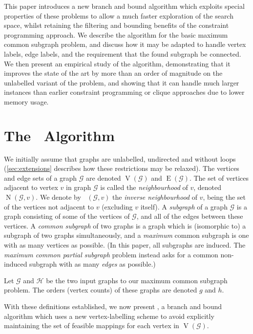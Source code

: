 \documentclass[letterpaper]{article}
\newcommand{\McSplit}{\textproc{McSplit}}
\newcommand{\graphG}{\mathcal{G}}
\newcommand{\graphH}{\mathcal{H}}
\DeclareMathOperator{\V}{V}
\DeclareMathOperator{\E}{E}
\DeclareMathOperator{\N}{N}
\DeclareMathOperator{\invN}{\overline{N}}
\begin{document}
This paper introduces a new branch and bound algorithm which exploits special
properties of these problems to allow a much faster exploration of the search
space, whilst retaining the filtering and bounding benefits of the constraint
programming approach. We describe the algorithm for the basic maximum common
subgraph problem, and discuss how it may be adapted to handle vertex labels,
edge labels, and the requirement that the found subgraph be connected. We then
present an empirical study of the algorithm, demonstrating that it improves the
state of the art by more than an order of magnitude on the unlabelled variant
of the problem, and showing that it can handle much larger instances than
earlier constraint programming or clique approaches due to lower memory usage.

\section{The \McSplit\ Algorithm}

We initially assume that graphs are unlabelled, undirected and without loops
(\cref{sec:extensions} describes how these restrictions may be relaxed).
The vertices and edge sets of a graph $\graphG$ are denoted $\V(\graphG)$ and $\E(\graphG)$.  The
set of vertices adjacent to vertex $v$ in graph $\graphG$ is called the
\emph{neighbourhood} of $v$, denoted $\N(\graphG, v)$. We denote by $\invN(\graphG, v)$ the
\emph{inverse neighbourhood} of $v$, being the set of the vertices not adjacent
to $v$ (excluding $v$ itself). A \emph{subgraph} of a graph $\graphG$ is a graph
consisting of some of the vertices of $\graphG$, and all of the edges between these
vertices. A \emph{common subgraph} of two graphs is a graph which is
(isomorphic to) a subgraph of two graphs simultaneously, and a \emph{maximum}
common subgraph is one with as many vertices as possible. (In this paper, all
subgraphs are induced. The \emph{maximum common partial subgraph} problem
instead asks for a common non-induced subgraph with as many \emph{edges} as
possible.)

Let $\graphG$ and $\graphH$ be the two input graphs to our maximum common subgraph problem.
The orders (vertex counts) of these graphs are denoted $g$ and $h$.

With these definitions established, we now present \McSplit, a branch and bound
algorithm which uses a new vertex-labelling scheme to avoid explicitly
maintaining the set of feasible mappings for each vertex in $\V(\graphG)$.
\end{document}
